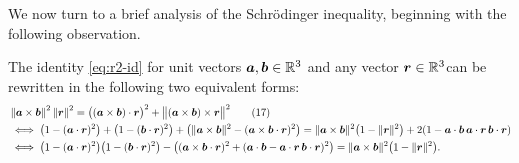 We now turn to a brief analysis of the Schr\"odinger inequality, beginning with the following observation.
\begin{lem}
The identity \eqref{eq:r2-id} for unit vectors $\bm{a},\bm{b}\in\mathbb{R}^3$ and any vector $\bm{r}\in\mathbb{R}^3$can be rewritten in the following two equivalent forms:
\begin{align}
 & \left\|\bm{a}\times\bm{b}\right\|^2 \left\|\bm{r}\right\|^2 = \bigl((\bm{a}\times\bm{b})\cdot\bm{r}\bigr)^2 + \bigl\|(\bm{a}\times\bm{b})\times\bm{r}\bigr\|^2\tag{17}\\
 &\iff  \left(1-(\bm{a}\cdot\bm{r})^2\right)+\left(1-(\bm{b}\cdot\bm{r})^2\right)+\left(\|\bm{a}\times\bm{b}\|^2-(\bm{a}\times\bm{b}\cdot\bm{r})^2\right)=\|\bm{a}\times\bm{b}\|^2\bigl(1-\|\bm{r}\|^2\bigr)+2(1-\bm{a}\cdot\bm{b}\,\bm{a}\cdot\bm{r}\,\bm{b}\cdot\bm{r})\label{eq:r2-id2}\\
 &\iff \bigl(1-(\bm{a}\cdot\bm{r})^2\bigr)\bigl(1-(\bm{b}\cdot\bm{r})^2\bigr)-
    \left((\bm{a}\times\bm{b}\cdot\bm{r})^2+(\bm{a}\cdot\bm{b}-\bm{a}\cdot\bm{r}\,\bm{b}\cdot\bm{r})^2\right)=\|\bm{a}\times\bm{b}\|^2\bigl(1-\|\bm{r}\|^2\bigr).\label{eq:r2-id3}
\end{align}
\end{lem}

